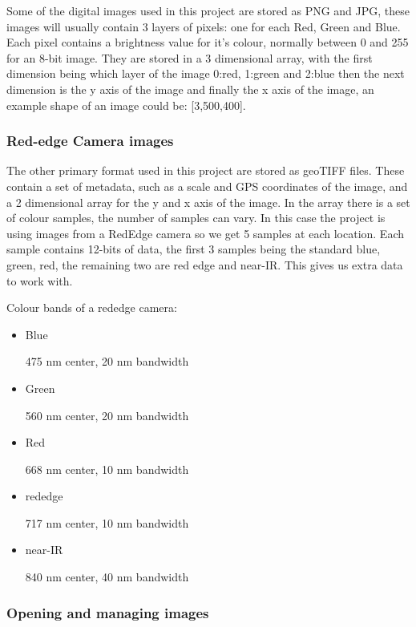 Some of the digital images used in this project are stored as PNG and JPG, these images will usually contain 3 layers of pixels: one for each Red, Green and Blue. Each pixel contains a brightness value for it's colour, normally between 0 and 255 for an 8-bit image. They are stored in a 3 dimensional array, with the first dimension being which layer of the image 0:red, 1:green and 2:blue then the next dimension is the y axis of the image and finally the x axis of the image, an example shape of an image could be: [3,500,400].

\subsubsection{Red-edge Camera images}
    
The other primary format used in this project are stored as geoTIFF files. These contain a set of metadata, such as a scale and GPS coordinates of the image, and a 2 dimensional array for the y and x axis of the image. In the array there is a set of colour samples, the number of samples can vary. In this case the project is using images from a RedEdge camera so we get 5 samples at each location. Each sample contains 12-bits of data, the first 3 samples being the standard blue, green, red, the remaining two are red edge and near-IR. This gives us extra data to work with.


Colour bands of a rededge camera:

\begin{itemize}
    \item Blue 
    
    475 nm center, 20 nm bandwidth
    
    \item Green 
    
    560 nm center, 20 nm bandwidth
    
    \item Red 
    
    668 nm center, 10 nm bandwidth
    
    \item rededge
    
    717 nm center, 10 nm bandwidth
    
    \item near-IR
    
    840 nm center, 40 nm bandwidth\cite{rededge}
\end{itemize}

\subsubsection{Opening and managing images}

